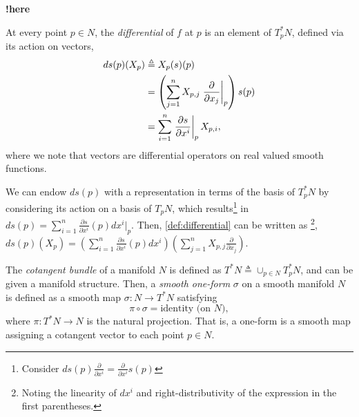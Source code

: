 \documentclass[psamsfonts]{amsart}
\theoremstyle{definition}
\theoremstyle{remark}
\newcommand*\isdefined{\triangleq}
\newcommand{\fracpartial}[2]{\frac{\partial #1}{\partial  #2}}
\numberwithin{equation}{section}
\begin{document}
{\color{magenta}\textbf{!here}\\}
{\color{red}

 

 At every point $p \in N$, the \textit{differential} of $f$ at $p$ is an element of $T^*_pN$, defined via its action on vectors, 
\begin{align}
    ds(p)(X_p) & \isdefined X_p(s)(p) \label{def:differential} \\%
     & = \left(\sum_{j = 1}^nX_{p, j}\left.\frac{\partial}{\partial x_j}\right\rvert_p\right)s(p) \notag \\
     & = \sum_{i = 1}^n \left.\frac{\partial s}{\partial x^i} \right\rvert_p X_{p, i}, \notag
\end{align}
where we note that vectors are differential operators on real valued smooth functions. 

We can endow $ds(p)$ with a representation in terms of the basis of $T^*_pN$ by considering its action on a basis of $T_pN$, which results\footnote{{\color{red}Consider $ds(p)\fracpartial{ }{x^i} = \fracpartial{}{x^i}s(p)$ }} in $ds(p) =\sum_{i = 1}^n \frac{\partial s}{\partial x^i}(p)dx^i\vert_p$. Then, \eqref{def:differential} can be written as \footnote{Noting the linearity of $dx^i$ and right-distributivity of the expression in the first parentheses.}, $ds(p)(X_p) = \left(\sum_{i = 1}^n \frac{\partial s}{\partial x^i}(p)dx^i  \right)\left(\sum_{j = 1}^nX_{p, j}\frac{\partial}{\partial x_j}\right)$. 

The \textit{cotangent bundle} of a manifold $N$ is defined as $T^*N \isdefined \cup_{p\in N}T_p^*N$, and can be given a manifold structure. Then, a \textit{smooth one-form} $\sigma$ on a smooth manifold $N$ is defined as a smooth map $\sigma : N \rightarrow T^*N$ satisfying $$\pi \circ \sigma = \text{identity (on } N),$$ where $\pi: T^*N \rightarrow N$ is the natural projection. That is, a one-form is a smooth map assigning a cotangent vector to each point $p\in N$.

}
\end{document}
